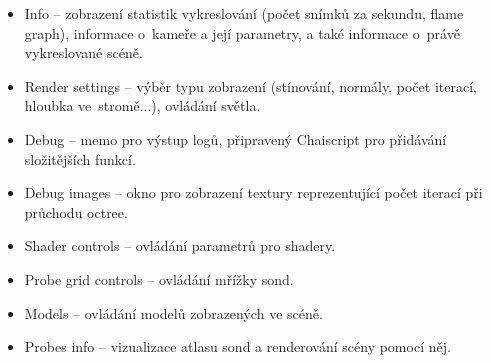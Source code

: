 \begin{itemize}
	\item Info -- zobrazení statistik vykreslování (počet snímků za sekundu, flame graph), informace o~kameře a její parametry, a také informace o~právě vykreslované scéně.
	\item Render settings -- výběr typu zobrazení (stínování, normály, počet iterací, hloubka ve~stromě...), ovládání světla.
	\item Debug -- memo pro výstup logů, připravený Chaiscript pro přidávání složitějších funkcí.
	\item Debug images -- okno pro zobrazení textury reprezentující počet iterací při průchodu octree.
	\item Shader controls -- ovládání parametrů pro shadery.
	\item Probe grid controls -- ovládání mřížky sond.
	\item Models -- ovládání modelů zobrazených ve scéně.
	\item Probes info -- vizualizace atlasu sond a renderování scény pomocí něj.
\end{itemize}



